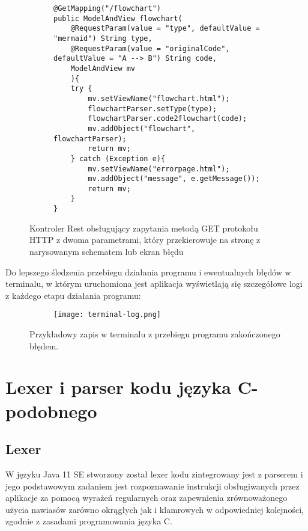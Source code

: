 \begin{figure}[H]
	\begin{subfigure}{\textwidth}
			\begin{verbatim}
@GetMapping("/flowchart")
public ModelAndView flowchart(
    @RequestParam(value = "type", defaultValue = "mermaid") String type,
    @RequestParam(value = "originalCode", defaultValue = "A --> B") String code,
    ModelAndView mv
    ){
    try {
        mv.setViewName("flowchart.html");
        flowchartParser.setType(type);
        flowchartParser.code2flowchart(code);
        mv.addObject("flowchart", flowchartParser);
        return mv;
    } catch (Exception e){
        mv.setViewName("errorpage.html");
        mv.addObject("message", e.getMessage());
        return mv;
    }
}
			\end{verbatim}
	\end{subfigure}\hfill
  	\caption{Kontroler Rest obsługujący zapytania metodą GET protokołu HTTP z dwoma parametrami, który przekierowuje na stronę z narysowanym schematem lub ekran błędu }
\end{figure}

\bigbreak
	Do lepszego śledzenia przebiegu działania programu i ewentualnych błędów w terminalu, w którym uruchomiona jest aplikacja wyświetlają się szczegółowe logi z każdego etapu działania programu:	
		
\begin{figure}[H]
  \begin{subfigure}{\textwidth}
  \centering
    \texttt{[image: terminal-log.png]}
  \end{subfigure}\hfill
  \caption{Przykładowy zapis w terminalu z przebiegu programu zakończonego błędem. }
\end{figure}
	

\section{Lexer i parser kodu języka C-podobnego}
	\subsection{Lexer} 
	W języku Java 11 SE stworzony został lexer kodu zintegrowany jest z parserem i jego podstawowym zadaniem jest rozpoznawanie instrukcji obsługiwanych przez aplikacje za pomocą wyrażeń regularnych oraz zapewnienia zrównoważonego użycia nawiasów zarówno okrągłych jak i klamrowych w odpowiedniej kolejności, zgodnie z zasadami programowania języka C. 

